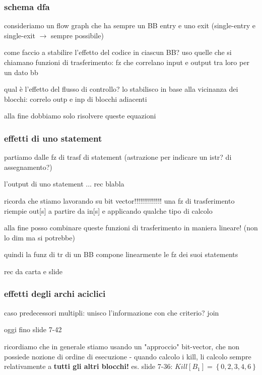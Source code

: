 \subsubsection{schema dfa}

consideriamo un flow graph che ha sempre un BB entry e uno exit (single-entry e single-exit $\rightarrow$ sempre possibile)

come faccio a stabilire l'effetto del codice in ciascun BB? uso quelle che si chiamano funzioni di trasferimento: fz che correlano input e output tra loro per un dato bb

qual \`e l'effetto del flusso di controllo? lo stabilisco in base alla vicinanza dei blocchi: correlo outp e inp di blocchi adiacenti

alla fine dobbiamo solo risolvere queste equazioni 

\subsubsection{effetti di uno statement}

partiamo dalle fz di trasf di statement (astrazione per indicare un istr? di assegnamento?)

l'output di uno statement ... rec blabla

ricorda che stiamo lavorando su bit vector!!!!!!!!!!!!!! una fz di trasferimento riempie out[s] a partire da in[s] e applicando qualche tipo di calcolo

alla fine posso combinare queste funzioni di trasferimento in maniera lineare! (non lo dim ma si potrebbe)

quindi la funz di tr di un BB compone linearmente le fz dei suoi statements

rec da carta e slide

\subsubsection{effetti degli archi aciclici}

caso predecessori multipli: unisco l'informazione con che criterio? join

oggi fino slide 7-42

ricordiamo che in generale stiamo usando un "approccio" bit-vector, che non possiede nozione di ordine di esecuzione - quando calcolo i kill, li calcolo sempre relativamente a \textbf{tutti gli altri blocchi!} es. slide 7-36: $Kill[B_1] = \left\lbrace0,2,3,4,6\right\rbrace$

